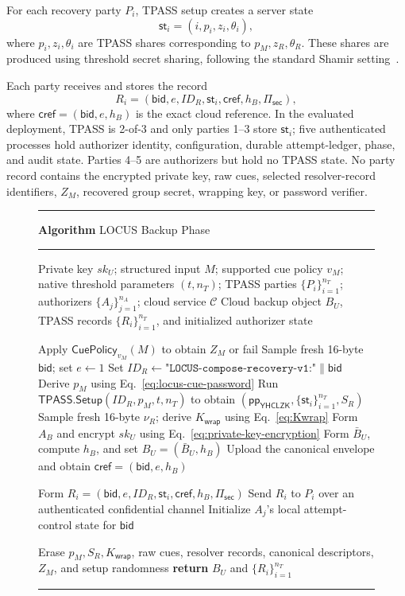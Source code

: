 \documentclass[sigconf,anonymous]{acmart}
\newcounter{protocol}
\renewcommand{\theprotocol}{\arabic{protocol}}
\newcommand{\protocolcaption}[1]{%
  \refstepcounter{protocol}%
  \vspace{2pt}\hrule\vspace{0.4ex}%
  {\raggedright\footnotesize\textbf{Algorithm \theprotocol} #1\par}%
  \vspace{0.4ex}\hrule\vspace{2pt}%
}
\newcommand{\TPASS}{\mathsf{TPASS}}
\newcommand{\YHCLZK}{\mathsf{YHCLZK}}
\begin{document}
For each recovery party \(P_i\), TPASS setup creates a server state
\[
\mathsf{st}_i=(i,p_i,z_i,\theta_i),
\]
where \(p_i,z_i,\theta_i\) are TPASS shares corresponding to \(p_M,z_R,\theta_R\). These shares are produced using threshold secret sharing, following the standard Shamir setting~\cite{Shamir1979}.

Each party receives and stores the record
\[
R_i =
(
\mathsf{bid},
e,
ID_R,
\mathsf{st}_i,
\mathsf{cref},
h_B,
\Pi_{\mathsf{sec}}
),
\]
where \(\mathsf{cref}=(\mathsf{bid},e,h_B)\) is the exact cloud reference.
In the evaluated deployment, TPASS is 2-of-3 and only parties 1--3 store
\(\mathsf{st}_i\); five authenticated processes hold authorizer identity,
configuration, durable attempt-ledger, phase, and audit state. Parties 4--5 are
authorizers but hold no TPASS state. No party record contains the encrypted
private key, raw cues, selected resolver-record identifiers, \(Z_M\), recovered
group secret, wrapping key, or password verifier.

\begin{figure}[t]
\protocolcaption{LOCUS Backup Phase}
\label{alg:locus-backup}
\footnotesize
\begin{algorithmic}[1]
\REQUIRE Private key \(sk_U\); structured input \(M\); supported cue policy \(v_M\); native threshold parameters \((t,n_T)\); TPASS parties \(\{P_i\}_{i=1}^{n_T}\); authorizers \(\{A_j\}_{j=1}^{n_A}\); cloud service \(\mathcal{C}\)
\ENSURE Cloud backup object \(B_U\), TPASS records \(\{R_i\}_{i=1}^{n_T}\), and initialized authorizer state

\STATE Apply \(\mathsf{CuePolicy}_{v_M}(M)\) to obtain \(Z_M\) or fail
\STATE Sample fresh 16-byte \(\mathsf{bid}\); set \(e\leftarrow1\)
\STATE Set \(ID_R\leftarrow\texttt{"LOCUS-compose-recovery-v1:"}\|\mathsf{bid}\)
\STATE Derive \(p_M\) using Eq.~\eqref{eq:locus-cue-password}
\STATE Run \(\TPASS.\mathsf{Setup}(ID_R,p_M,t,n_T)\) to obtain \((\mathsf{pp}_{\YHCLZK},\{\mathsf{st}_i\}_{i=1}^{n_T},S_R)\)
\STATE Sample fresh 16-byte \(\nu_R\); derive \(K_{\mathsf{wrap}}\) using Eq.~\eqref{eq:Kwrap}
\STATE Form \(A_B\) and encrypt \(sk_U\) using Eq.~\eqref{eq:private-key-encryption}
\STATE Form \(\bar B_U\), compute \(h_B\), and set \(B_U=(\bar B_U,h_B)\)
\STATE Upload the canonical envelope and obtain \(\mathsf{cref}=(\mathsf{bid},e,h_B)\)

    \STATE Form \(R_i=(\mathsf{bid},e,ID_R,\mathsf{st}_i,\mathsf{cref},h_B,\Pi_{\mathsf{sec}})\)
    \STATE Send \(R_i\) to \(P_i\) over an authenticated confidential channel
\ENDFOR
{}
    \STATE Initialize \(A_j\)'s local attempt-control state for \(\mathsf{bid}\)
\ENDFOR

\STATE Erase \(p_M,S_R,K_{\mathsf{wrap}}\), raw cues, resolver records, canonical descriptors, \(Z_M\), and setup randomness
\STATE \textbf{return} \(B_U\) and \(\{R_i\}_{i=1}^{n_T}\)
\end{algorithmic}
\vspace{1pt}\hrule
\end{figure}
\end{document}
